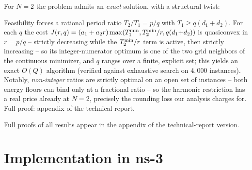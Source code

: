 For $N = 2$ the problem admits an \emph{exact} solution, with a
structural twist:

\begin{theorem}[exact $N{=}2$]
\label{thm:n2}
Feasibility forces a rational period ratio $T_2/T_1 = p/q$ with
$T_1 \ge q(d_1 + d_2)$. For each $q$ the cost
$J(r,q) = (a_1 + a_2 r)\max(T^{\min}_1, T^{\min}_2/r, q(d_1{+}d_2))$ is quasiconvex
in $r = p/q$ -- strictly decreasing while the $T^{\min}_2/r$ term is active, then
strictly increasing -- so its integer-numerator optimum is one of the two
grid neighbors of the continuous minimizer, and $q$ ranges over a finite,
explicit set; this yields an exact $O(Q)$ algorithm (verified against
exhaustive search on $4{,}000$ instances). Notably, \emph{non-integer} ratios
are strictly optimal on an open set of instances -- both energy floors can
bind only at a fractional ratio -- so the harmonic restriction has a real
price already at $N = 2$, precisely the rounding loss our analysis charges
for. Full proof: appendix of the technical report.
\end{theorem}

\ifdefined\TECHREPORT\else
Full proofs of all results appear in the appendix of the technical-report
version.
\fi

\section{Implementation in ns-3}
\label{sec:implementation}

